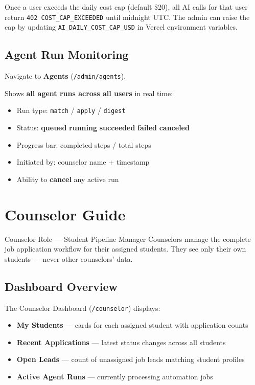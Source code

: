\documentclass[11pt, a4paper]{article}
\newcommand{\nav}[1]{\textbf{\textcolor{accent}{#1}}}
\newcommand{\badge}[2]{\colorbox{#1!15}{\textcolor{#1}{\small\textbf{#2}}}}
\begin{document}
\begin{warningbox}
Once a user exceeds the daily cost cap (default \$20), all AI calls for that user return \texttt{402 COST\_CAP\_EXCEEDED} until midnight UTC. The admin can raise the cap by updating \texttt{AI\_DAILY\_COST\_CAP\_USD} in Vercel environment variables.
\end{warningbox}

\subsection{Agent Run Monitoring}

Navigate to \nav{Agents} (\texttt{/admin/agents}).

Shows \textbf{all agent runs across all users} in real time:
\begin{itemize}
  \item Run type: \texttt{match} / \texttt{apply} / \texttt{digest}
  \item Status: \badge{warning}{queued} \badge{accent}{running} \badge{success}{succeeded} \badge{danger}{failed} \badge{secondary}{canceled}
  \item Progress bar: completed steps / total steps
  \item Initiated by: counselor name + timestamp
  \item Ability to \textbf{cancel} any active run
\end{itemize}

\section{Counselor Guide}

\begin{rolebox}[counselorcolor]{Counselor Role — Student Pipeline Manager}
Counselors manage the complete job application workflow for their assigned students. They see only their own students — never other counselors' data.
\end{rolebox}

\subsection{Dashboard Overview}

The Counselor Dashboard (\texttt{/counselor}) displays:
\begin{itemize}
  \item \textbf{My Students} — cards for each assigned student with application counts
  \item \textbf{Recent Applications} — latest status changes across all students
  \item \textbf{Open Leads} — count of unassigned job leads matching student profiles
  \item \textbf{Active Agent Runs} — currently processing automation jobs
\end{itemize}
\end{document}
